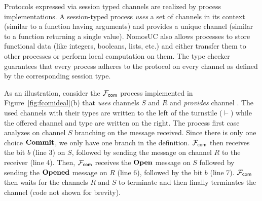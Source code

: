 Protocols expressed via session typed channels are realized by process implementations.
A session-typed process \emph{uses} a set of channels in its context (similar to a function
having arguments) and provides a unique channel (similar to a function returning a single value).
NomosUC also allows processes to store functional data (like integers, booleans, lists, etc.)
and either transfer them to other processes or perform local computation on them.
The type checker guarantees that every process adheres to the protocol on every channel as defined by
the corresponding session type.

As an illustration, consider the $\mathcal{F}_{{\mathsf {com}}}$ process implemented in Figure~\ref{fig:fcomideal}(b)
that \emph{uses} channels $S$ and $R$ and \emph{provides} channel .
The used channels with their types are written to the left of the turnstile
($\vdash$) while the offered channel and type are written on the right.
The process first case analyzes on channel $S$ branching on the
message received.
Since there is only one choice $\mathbf{Commit}$, we only have one
branch in the definition.
$\mathcal{F}_{{\mathsf {com}}}$ then receives the bit $b$ (line 3) on $S$, followed by sending the
 message on channel $R$ to the receiver (line 4).
Then, $\mathcal{F}_{{\mathsf {com}}}$ receives the $\mathbf{Open}$ message on $S$ followed by sending the
$\mathbf{Opened}$ message on $R$ (line 6), followed by the bit $b$ (line 7).
$\mathcal{F}_{{\mathsf {com}}}$ then waits for the channels $R$ and $S$ to terminate and then finally
terminates the  channel (code not shown for brevity).



